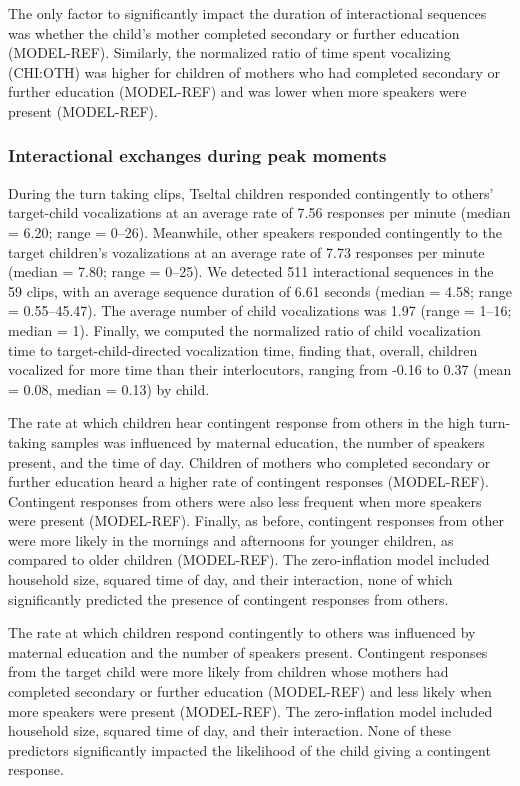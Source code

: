 \documentclass[floatsintext,man]{apa6}
\theoremstyle{definition}
\theoremstyle{definition}
\theoremstyle{definition}
\theoremstyle{remark}
\begin{document}
The only factor to significantly impact the duration of interactional
sequences was whether the child's mother completed secondary or further
education (MODEL-REF). Similarly, the normalized ratio of time spent
vocalizing (CHI:OTH) was higher for children of mothers who had
completed secondary or further education (MODEL-REF) and was lower when
more speakers were present (MODEL-REF).

\subsubsection{Interactional exchanges during peak
moments}\label{interactional-exchanges-during-peak-moments}

During the turn taking clips, Tseltal children responded contingently to
others' target-child vocalizations at an average rate of 7.56 responses
per minute (median = 6.20; range = 0--26). Meanwhile, other speakers
responded contingently to the target children's vozalizations at an
average rate of 7.73 responses per minute (median = 7.80; range =
0--25). We detected 511 interactional sequences in the 59 clips, with an
average sequence duration of 6.61 seconds (median = 4.58; range =
0.55--45.47). The average number of child vocalizations was 1.97 (range
= 1--16; median = 1). Finally, we computed the normalized ratio of child
vocalization time to target-child-directed vocalization time, finding
that, overall, children vocalized for more time than their
interlocutors, ranging from -0.16 to 0.37 (mean = 0.08, median = 0.13)
by child.

The rate at which children hear contingent response from others in the
high turn-taking samples was influenced by maternal education, the
number of speakers present, and the time of day. Children of mothers who
completed secondary or further education heard a higher rate of
contingent responses (MODEL-REF). Contingent responses from others were
also less frequent when more speakers were present (MODEL-REF). Finally,
as before, contingent responses from other were more likely in the
mornings and afternoons for younger children, as compared to older
children (MODEL-REF). The zero-inflation model included household size,
squared time of day, and their interaction, none of which significantly
predicted the presence of contingent responses from others.

The rate at which children respond contingently to others was influenced
by maternal education and the number of speakers present. Contingent
responses from the target child were more likely from children whose
mothers had completed secondary or further education (MODEL-REF) and
less likely when more speakers were present (MODEL-REF). The
zero-inflation model included household size, squared time of day, and
their interaction. None of these predictors significantly impacted the
likelihood of the child giving a contingent response.
\end{document}
